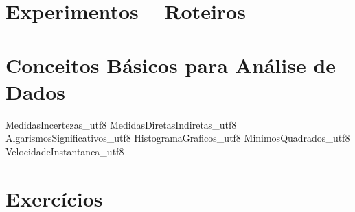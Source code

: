 \documentclass[12pt,a4paper,]{book}
\begin{document}



\tableofcontents


%



\part{Experimentos -- Roteiros}



\part[Conceitos Básicos para Análise de Dados]{Conceitos Básicos para Análise de Dados}
 {MedidasIncertezas_utf8}
 {MedidasDiretasIndiretas_utf8}
 {AlgarismosSignificativos_utf8}
 {HistogramaGraficos_utf8}
 {MinimosQuadrados_utf8}
 {VelocidadeInstantanea_utf8}

%

%
%
%
%
%
%
%

\part{Exercícios}


%
%
\end{document}

